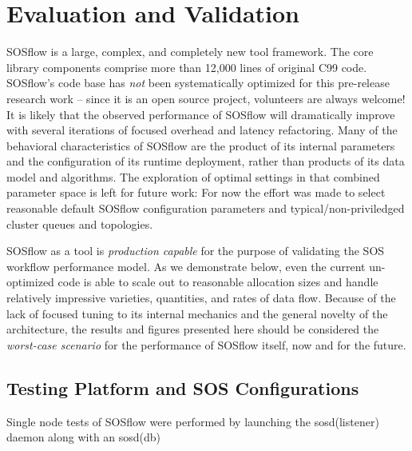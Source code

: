 
\section{Evaluation and Validation}

SOSflow is a large, complex, and completely new tool framework. The
core library components comprise more than 12,000 lines of original
C99 code. SOSflow's code base has \textit{not} been systematically
optimized for this pre-release research work -- since it is an open
source project, volunteers are always welcome! It is likely that the
observed performance of SOSflow will dramatically improve with several
iterations of focused overhead and latency refactoring. Many of the
behavioral characteristics of SOSflow are the product of its internal
parameters and the configuration of its runtime deployment, rather
than products of its data model and algorithms. The exploration of
optimal settings in that combined parameter space is left for future
work: For now the effort was made to select reasonable default SOSflow
configuration parameters and typical/non-priviledged cluster
queues and topologies.

SOSflow as a tool is \textit{production capable} for the purpose of
validating the SOS workflow performance model. As we demonstrate
below, even the current un-optimized code is able to scale out to
reasonable allocation sizes and handle relatively impressive
varieties, quantities, and rates of data flow. Because of the lack of
focused tuning to its internal mechanics and the general novelty of
the architecture, the results and figures presented here should be
considered the \textit{worst-case scenario} for the performance of
SOSflow itself, now and for the future.

\subsection{Testing Platform and SOS Configurations}

Single node tests of SOSflow were performed by launching the
sosd(listener) daemon along with an sosd(db)







